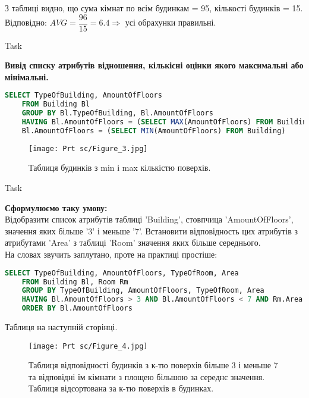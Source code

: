 \documentclass[a4paper,12pt]{article}
\newcommand{\RomanNumeralCaps}[1]{\MakeUppercase{\romannumeral #1}}
\begin{document}
    З таблиці видно, що сума кімнат по всім будинкам = 95, кількості будинків = 15.
    Відповідно: $AVG=\dfrac{96}{15}=6.4\Rightarrow$ усі обрахунки правильні. 

\newpage
    \begin{center}
        \Large{Task \RomanNumeralCaps{2}}
    \end{center}
    \textbf{Вивід списку атрибутів відношення, кількісні оцінки якого максимальні або мінімальні.}
    \begin{lstlisting}[language=SQL]
    SELECT TypeOfBuilding, AmountOfFloors
    FROM Building Bl
    GROUP BY Bl.TypeOfBuilding, Bl.AmountOfFloors
    HAVING Bl.AmountOfFloors = (SELECT MAX(AmountOfFloors) FROM Building) OR 
    Bl.AmountOfFloors = (SELECT MIN(AmountOfFloors) FROM Building)
    \end{lstlisting}
    \begin{figure}[h!]
		\begin{minipage}[h]{1\linewidth}
            \centering
			\texttt{[image: Prt sc/Figure\_3.jpg]}  
		\end{minipage}
		\caption{Таблиця будинків з min і max кількістю поверхів.}
	\end{figure}
    \begin{center}
        \Large{Task \RomanNumeralCaps{3}}
    \end{center}
    \textbf{Сформулюємо таку умову:} \\
    Відобразити список атрибутів таблиці 'Building', стовпчица 'AmountOfFloors',
    значення яких більше '3' і меньше '7'. Встановити відповідность цих атрибутів з атрибутами
    'Area' з таблиці 'Room' значення яких більше середнього. \\
    На словах звучить заплутано, проте на практиці простіше:
    \begin{lstlisting}[language=SQL]
    SELECT TypeOfBuilding, AmountOfFloors, TypeOfRoom, Area
    FROM Building Bl, Room Rm
    GROUP BY TypeOfBuilding, AmountOfFloors, TypeOfRoom, Area
    HAVING Bl.AmountOfFloors > 3 AND Bl.AmountOfFloors < 7 AND Rm.Area > (SELECT AVG(Area) FROM Room)
    ORDER BY Bl.AmountOfFloors
    \end{lstlisting}
    Таблиця на наступній сторінці.
\newpage
    \begin{figure}[h!]
		\begin{minipage}[h]{1\linewidth}
            \centering
			\texttt{[image: Prt sc/Figure\_4.jpg]}  
		\end{minipage}
		\caption{Таблиця відповідності будинків з к-тю поверхів більше 3 і меньше 7 та відповідні
        їм кімнати з площею більшою за середнє значення. Таблиця відсортована за к-тю поверхів в будинках.}
	\end{figure}
\end{document}
